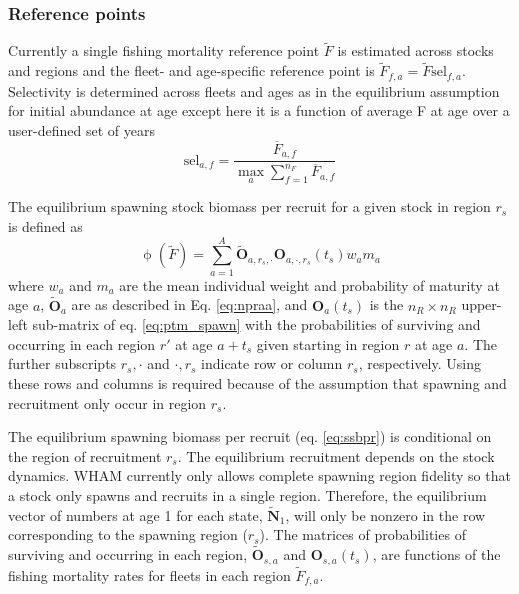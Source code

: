 \documentclass[
]{article}
\begin{document}
\hypertarget{reference-points}{%
\subsubsection*{Reference points}\label{reference-points}}

Currently a single fishing mortality reference point \(\widetilde F\) is estimated across stocks and regions and the fleet- and age-specific reference point is \(\widetilde F_{f,a} = \widetilde F \text{sel}_{f,a}\). Selectivity is determined across fleets and ages as in the equilibrium assumption for initial abundance at age except here it is a function of average F at age over a user-defined set of years
\begin{equation}\label{eq:spr_sel}
  \text{sel}_{a,f} = \frac{\overline F_{a,f}}{\max_a \sum^{n_F}_{f=1}{\overline F}_{a,f}}
\end{equation}

The equilibrium spawning stock biomass per recruit for a given stock in region \(r_s\) is defined as
\begin{equation}\label{eq:ssbpr}
 \upphi(\widetilde{F}) = \sum^{A}_{a=1} \widetilde{\mathbf{O}}_{a,r_s,\cdot} \mathbf{O}_{a,\cdot,r_s}(t_s) w_{a} m_{a}
\end{equation}
where \(w_{a}\) and \(m_{a}\) are the mean individual weight and probability of maturity at age \(a\), \(\widetilde{\mathbf{O}}_{a}\) are as described in Eq. \ref{eq:npraa}, and \(\mathbf{O}_{a}(t_s)\) is the \(n_R \times n_R\) upper-left sub-matrix of eq. \ref{eq:ptm_spawn} with the probabilities of surviving and occurring in each region \(r'\) at age \(a+t_s\) given starting in region \(r\) at age \(a\). The further subscripts \(r_s,\cdot\) and \(\cdot,r_s\) indicate row or column \(r_s\), respectively. Using these rows and columns is required because of the assumption that spawning and recruitment only occur in region \(r_s\).

The equilibrium spawning biomass per recruit (eq. \ref{eq:ssbpr}) is conditional on the region of recruitment \(r_s\). The equilibrium recruitment depends on the stock dynamics. WHAM currently only allows complete spawning region fidelity so that a stock only spawns and recruits in a single region. Therefore, the equilibrium vector of numbers at age 1 for each state, \(\widetilde {\mathbf{N}}_{1}\), will only be nonzero in the row corresponding to the spawning region (\(r_s\)). The matrices of probabilities of surviving and occurring in each region, \(\widetilde{\mathbf{O}}_{s,a}\) and \(\mathbf{O}_{s,a}(t_s)\), are functions of the fishing mortality rates for fleets in each region \(\widetilde F_{f,a}\).
\end{document}
